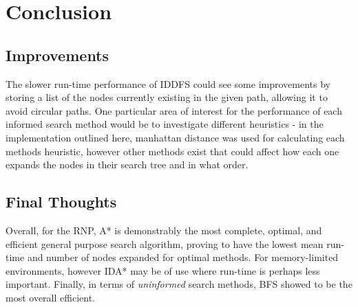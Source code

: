 \section{Conclusion} %
\label{sec:conclusion}

\subsection{Improvements} %
\label{sub:improvements}
The slower run-time performance of IDDFS could see some improvements by storing a list of the nodes currently existing in the given path, allowing it to avoid circular paths. One particular area of interest for the performance of each informed search method would be to investigate different heuristics - in the implementation outlined here, manhattan distance was used for calculating each methods heuristic, however other methods exist that could affect how each one expands the nodes in their search tree and in what order.

\subsection{Final Thoughts} %
\label{sub:final_thoughts}
Overall, for the RNP, A* is demonstrably the most complete, optimal, and efficient general purpose search algorithm, proving to have the lowest mean run-time and number of nodes expanded for optimal methods. For memory-limited environments, however IDA* may be of use where run-time is perhaps less important. Finally, in terms of \textit{uninformed} search methods, BFS showed to be the most overall efficient.

